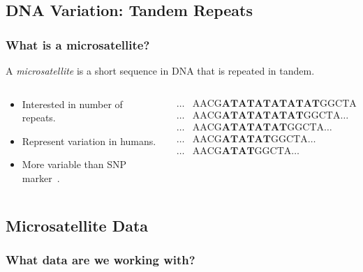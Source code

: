 \documentclass[11pt]{beamer}
\begin{document}
	\subsection{DNA Variation: Tandem Repeats}\label{subsec:dvtr}
    \begin{frame}
        \frametitle{What is a microsatellite?}
        \begin{definition}[Microsatellite]
            A \emph{microsatellite} is a short sequence in DNA that is repeated in tandem.
        \end{definition} \bigskip

        \begin{columns}
            \begin{column}{0.4\textwidth}
                \begin{itemize}
                    \item Interested in number of repeats.
                    \item Represent variation in humans.
                    \item More variable than SNP marker~\cite{gemayelJunkVariableTandemRepeats2012}.
                \end{itemize}
            \end{column}
            \begin{column}{0.6\textwidth}
                \begin{equation*}
                    \begin{aligned}
                         \ldots &\text{AACG}\textbf{ATATATATATAT}\text{GGCTA} \ldots \\
                         \ldots &\text{AACG}\textbf{ATATATATAT}\text{GGCTA} \ldots \\
                         \ldots &\text{AACG}\textbf{ATATATAT}\text{GGCTA} \ldots \\
                         \ldots &\text{AACG}\textbf{ATATAT}\text{GGCTA} \ldots \\
                         \ldots &\text{AACG}\textbf{ATAT}\text{GGCTA} \ldots
                    \end{aligned}
                \end{equation*}
            \end{column}
        \end{columns}
    \end{frame}

    \subsection{Microsatellite Data}\label{subsec:md}
    \begin{frame}
        \frametitle{What data are we working with?} \bigskip
        \centering{}
        \bigskip
        \newline
    \end{frame}
\end{document}
